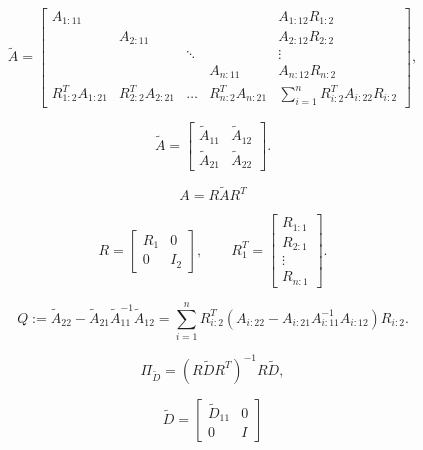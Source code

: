 \documentclass[11pt]{article}
\begin{document}
\begin{equation}\label{eq:auxA}
\widetilde{A}=
\left[ \begin{array}{ccccc}
A_{1:11} &&&& A_{1:12} R_{1:2} \\[0.5ex]
& A_{2:11} &&& A_{2:12} R_{2:2} \\[0.5ex]
&& \ddots && \vdots \\[0.5ex]
&&& A_{{n}:11} & A_{{n}:12} R_{n:2} \\[0.5ex]
R_{1:2}^T A_{1:21} & R_{2:2}^T A_{2:21} & \hdots & R^T_{n:2} A_{{n}:21} 
& \displaystyle \sum_{i=1}^{n} R^T_{i:2} A_{i:22} R_{i:2}
                \end{array}
\right] ,
\end{equation}

\begin{equation}\label{eq:A_two_by_two}
\widetilde{A}=\left[
        \begin{array}{cc}
        \widetilde{A}_{11} & \widetilde{A}_{12} \\
        \widetilde{A}_{21} & \widetilde{A}_{22}
        \end{array}
\right].
\end{equation}

\begin{equation}
A=R \widetilde{A} R^T 
\end{equation}

\begin{equation}\label{eq:R}
R=\left[ \begin{array}{cc}
           R_1 & 0 \\ 0 & I_2
           \end{array}
\right] , \qquad
R_1^T=\left[ \begin{array}{c}
           R_{1:1} \\ R_{2:1} \\ \vdots \\ R_{n:1}
           \end{array}
\right] .
\end{equation}

$$Q:= \widetilde{A}_{22} - 
\widetilde{A}_{21} \widetilde{A}_{11}^{-1} \widetilde{A}_{12}
=\sum_{i=1}^{n} R_{{i}:2}^T (A_{{i}:22} - A_{{i}:21} 
A_{{i}:11}^{-1} A_{{i}:12}) R_{{i}:2}.
$$

\begin{equation}\label{eq:Pi}
\Pi_{\widetilde{D}}=(R \widetilde{D} R^T)^{-1} R \widetilde{D}, 
\end{equation}

\begin{equation}\label{eq:tilde_D}
\widetilde{D}=\left[
             \begin{array}{cc}
              \widetilde{D}_{11} & 0 \\
              0 & I
             \end{array}
           \right]
\end{equation}
\end{document}
